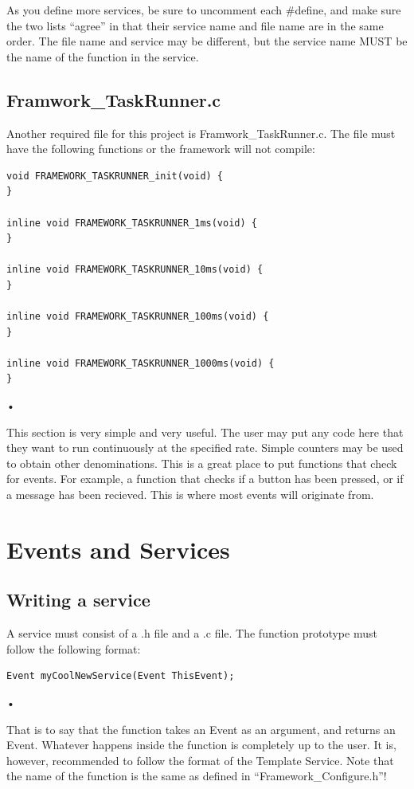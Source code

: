 \documentclass[12pt compsoc]{article}
\begin{document}
As you define more services, be sure to uncomment each \#define, and make sure the two lists ``agree'' in that their service name and file name are in the same order. The file name and service may be different, but the service name MUST be the name of the function in the service.

\subsection{Framwork\_TaskRunner.c}
Another required file for this project is Framwork\_TaskRunner.c. The file must have the following functions or the framework will not compile:

\begin{verbatim}
void FRAMEWORK_TASKRUNNER_init(void) {
}

inline void FRAMEWORK_TASKRUNNER_1ms(void) {
}

inline void FRAMEWORK_TASKRUNNER_10ms(void) {
}

inline void FRAMEWORK_TASKRUNNER_100ms(void) {
}

inline void FRAMEWORK_TASKRUNNER_1000ms(void) {
}
\end{verbatim}•

This section is very simple and very useful. The user may put any code here that they want to run continuously at the specified rate. Simple counters may be used to obtain other denominations. This is a great place to put functions that check for events. For example, a function that checks if a button has been pressed, or if a message has been recieved. This is where most events will originate from.

\section{Events and Services}
\subsection{Writing a service}
A service must consist of a .h file and a .c file. The function prototype must follow the following format:

\begin{verbatim}
Event myCoolNewService(Event ThisEvent);
\end{verbatim}•

That is to say that the function takes an Event as an argument, and returns an Event. Whatever happens inside the function is completely up to the user. It is, however, recommended to follow the format of the Template Service. Note that the name of the function is the same as defined in ``Framework\_Configure.h''!
\end{document}
